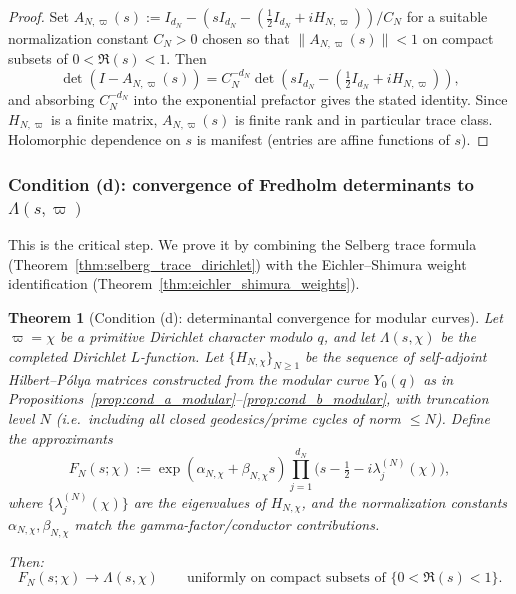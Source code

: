 \documentclass[11pt,oneside]{amsbook}
\numberwithin{equation}{section}
\theoremstyle{plain}
\newtheorem{theorem}{Theorem}[section]
\theoremstyle{definition}
\theoremstyle{remark}
\begin{document}
\begin{proof}
Set $A_{N,\varpi}(s):=I_{d_N}-(sI_{d_N}-(\tfrac12 I_{d_N}+iH_{N,\varpi}))/ C_N$ for a suitable normalization constant $C_N>0$ chosen so that $\|A_{N,\varpi}(s)\|<1$ on compact subsets of $0<\Re(s)<1$.
Then
\[
\det(I-A_{N,\varpi}(s)) = C_N^{-d_N}\det(sI_{d_N}-(\tfrac12 I_{d_N}+iH_{N,\varpi})),
\]
and absorbing $C_N^{-d_N}$ into the exponential prefactor gives the stated identity.
Since $H_{N,\varpi}$ is a finite matrix, $A_{N,\varpi}(s)$ is finite rank and in particular trace class.
Holomorphic dependence on $s$ is manifest (entries are affine functions of $s$).
\end{proof}

\subsubsection{Condition (d): convergence of Fredholm determinants to $\Lambda(s,\varpi)$}

This is the critical step.  We prove it by combining the Selberg trace formula (Theorem~\ref{thm:selberg_trace_dirichlet}) with the Eichler--Shimura weight identification (Theorem~\ref{thm:eichler_shimura_weights}).

\begin{theorem}[Condition (d): determinantal convergence for modular curves]
\label{thm:cond_d_modular}
Let $\varpi=\chi$ be a primitive Dirichlet character modulo $q$, and let $\Lambda(s,\chi)$ be the completed Dirichlet $L$-function.
Let $\{H_{N,\chi}\}_{N\ge 1}$ be the sequence of self-adjoint Hilbert--P\'olya matrices constructed from the modular curve $Y_0(q)$ as in Propositions~\ref{prop:cond_a_modular}--\ref{prop:cond_b_modular}, with truncation level $N$ (i.e.\ including all closed geodesics/prime cycles of norm $\le N$).
Define the approximants
\[
F_N(s;\chi):=\exp(\alpha_{N,\chi}+\beta_{N,\chi}s)\prod_{j=1}^{d_N}\bigl(s-\tfrac12-i\lambda_j^{(N)}(\chi)\bigr),
\]
where $\{\lambda_j^{(N)}(\chi)\}$ are the eigenvalues of $H_{N,\chi}$, and the normalization constants $\alpha_{N,\chi},\beta_{N,\chi}$ match the gamma-factor/conductor contributions.

Then:
\begin{equation}
\label{eq:cond_d_convergence}
F_N(s;\chi)\longrightarrow \Lambda(s,\chi)\qquad\text{uniformly on compact subsets of }\{0<\Re(s)<1\}.
\end{equation}
\end{theorem}
\end{document}
